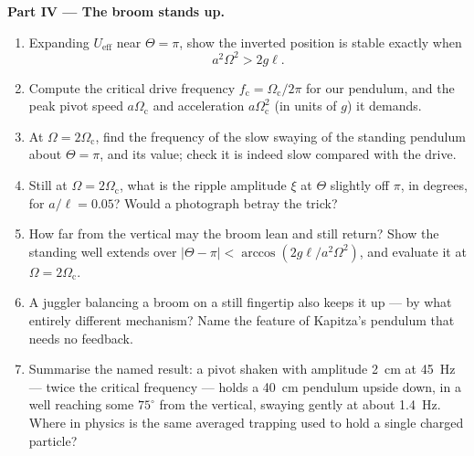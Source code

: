\begin{problem}
\medskip\noindent\textbf{Part IV --- The broom stands up.}
\begin{enumerate}[resume]
  \item Expanding $U_{\text{eff}}$ near $\Theta = \pi$, show the
        inverted position is stable exactly when
        \[
        a^2\Omega^2 > 2g\ell .
        \]
  \item Compute the critical drive frequency $f_{\text{c}} =
        \Omega_{\text{c}}/2\pi$ for our pendulum, and the peak pivot
        speed $a\Omega_{\text{c}}$ and acceleration
        $a\Omega_{\text{c}}^2$ (in units of $g$) it demands.
  \item At $\Omega = 2\Omega_{\text{c}}$, find the frequency of the
        slow swaying of the standing pendulum about $\Theta = \pi$,
        and its value; check it is indeed slow compared with the
        drive.
  \item Still at $\Omega = 2\Omega_{\text{c}}$, what is the ripple
        amplitude $\xi$ at $\Theta$ slightly off $\pi$, in degrees,
        for $a/\ell = 0.05$? Would a photograph betray the trick?
  \item How far from the vertical may the broom lean and still return?
        Show the standing well extends over $|\Theta - \pi| <
        \arccos(2g\ell/a^2\Omega^2)$, and evaluate it at $\Omega =
        2\Omega_{\text{c}}$.
  \item A juggler balancing a broom on a still fingertip also keeps it
        up --- by what entirely different mechanism? Name the feature
        of Kapitza's pendulum that needs no feedback.
  \item Summarise the named result: a pivot shaken with amplitude
        \qty{2}{cm} at \qty{45}{Hz} --- twice the critical frequency
        --- holds a \qty{40}{cm} pendulum upside down, in a well
        reaching some $75^\circ$ from the vertical, swaying gently at
        about \qty{1.4}{Hz}. Where in physics is the same averaged
        trapping used to hold a single charged particle?
\end{enumerate}
\end{problem}
